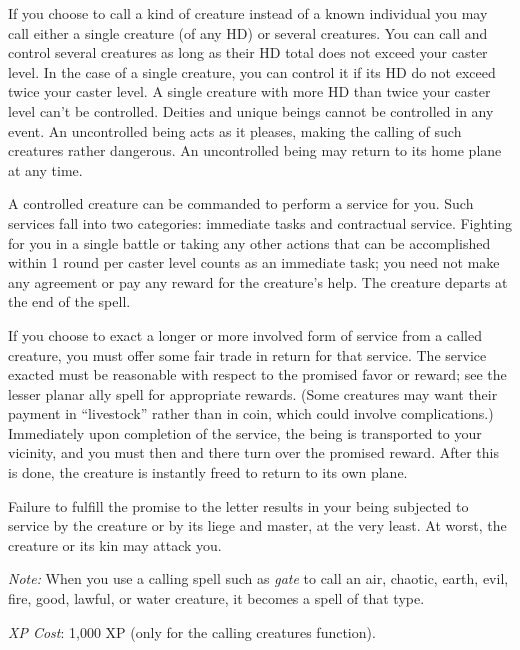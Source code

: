 {	If you choose to call a kind of creature instead of a known individual you may call either a single creature (of any HD) or several creatures. You can call and control several creatures as long as their HD total does not exceed your caster level. In the case of a single creature, you can control it if its HD do not exceed twice your caster level. A single creature with more HD than twice your caster level can't be controlled. Deities and unique beings cannot be controlled in any event. An uncontrolled being acts as it pleases, making the calling of such creatures rather dangerous. An uncontrolled being may return to its home plane at any time.

	A controlled creature can be commanded to perform a service for you. Such services fall into two categories: immediate tasks and contractual service. Fighting for you in a single battle or taking any other actions that can be accomplished within 1 round per caster level counts as an immediate task; you need not make any agreement or pay any reward for the creature's help. The creature departs at the end of the spell.

	If you choose to exact a longer or more involved form of service from a called creature, you must offer some fair trade in return for that service. The service exacted must be reasonable with respect to the promised favor or reward; see the lesser planar ally spell for appropriate rewards. (Some creatures may want their payment in ``livestock'' rather than in coin, which could involve complications.) Immediately upon completion of the service, the being is transported to your vicinity, and you must then and there turn over the promised reward. After this is done, the creature is instantly freed to return to its own plane.

	Failure to fulfill the promise to the letter results in your being subjected to service by the creature or by its liege and master, at the very least. At worst, the creature or its kin may attack you.

	\textit{Note:} When you use a calling spell such as \emph{gate} to call an air, chaotic, earth, evil, fire, good, lawful, or water creature, it becomes a spell of that type.

	\textit{XP Cost}:
	1,000 XP (only for the calling creatures function).

}
